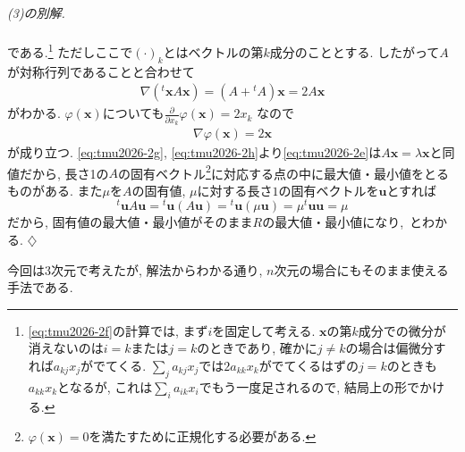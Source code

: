 \documentclass[titlepage]{jsarticle}
\numberwithin{equation}{section}
\newenvironment{kaitou}[1][解]{%
\begin{proofbox}%
\textit{#1. }\ignorespaces
}{%
\hfill$\diamondsuit$%
\end{proofbox}%
}
\begin{document}
\begin{kaitou}[(3)の別解]
\begin{align}
\end{align}
である.\footnote{\eqref{eq:tmu2026-2f}の計算では, まず$i$を固定して考える. $\bm{x}$の第$k$成分での微分が消えないのは$i = k$または$j = k$のときであり, 確かに$j \ne k$の場合は偏微分すれば$a_{kj}x_j$がでてくる. $\sum_j a_{kj}x_j$では$2a_{kk}x_k$がでてくるはずの$j = k$のときも$a_{kk}x_k$となるが, これは$\sum_i a_{ik}x_i$でもう一度足されるので, 結局上の形でかける.} ただしここで$(\cdot)_k$とはベクトルの第$k$成分のこととする. したがって$A$が対称行列であることと合わせて
\begin{align}
\nabla\left({}^t\bm{x}A\bm{x}\right) = (A + {}^t\!A)\bm{x} = 2A\bm{x}\label{eq:tmu2026-2g}
\end{align}
がわかる. $\varphi(\bm{x})$についても$\frac{\partial}{\partial x_k}\varphi(\bm{x}) = 2x_k$
なので
\begin{align}
\nabla \varphi(\bm{x}) = 2\bm{x}\label{eq:tmu2026-2h}
\end{align}
が成り立つ. \eqref{eq:tmu2026-2g}, \eqref{eq:tmu2026-2h}より\eqref{eq:tmu2026-2e}は$A\bm{x} = \lambda\bm{x}$と同値だから, 長さ1の$A$の固有ベクトル\footnote{$\varphi(\bm{x}) = 0$を満たすために正規化する必要がある.}に対応する点の中に最大値・最小値をとるものがある. また$\mu$を$A$の固有値, $\mu$に対する長さ$1$の固有ベクトルを$\bm{u}$とすれば
\[
{}^t\bm{u}A\bm{u} = {}^t\bm{u}(A\bm{u}) = {}^t\bm{u}(\mu\bm{u}) = \mu{}^t\bm{u}\bm{u} = \mu
\]
だから, 固有値の最大値・最小値がそのまま$R$の最大値・最小値になり, \,とわかる.
\end{kaitou}
今回は$3$次元で考えたが, 解法からわかる通り, $n$次元の場合にもそのまま使える手法である. 
\end{document}

